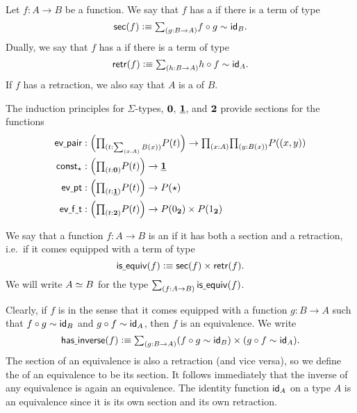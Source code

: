 \begin{defn}
Let $f:A\to B$ be a function. We say that $f$ has a  if there is a term of type
\begin{equation*}
\mathsf{sec}(f) \defeq \sm{g:B\to A} f\circ g\htpy \idfunc[B].
\end{equation*}
Dually, we say that $f$ has a  if there is a term of type
\begin{equation*}
\mathsf{retr}(f) \defeq \sm{h:B\to A} h\circ f\htpy \idfunc[A].
\end{equation*}
If $f$ has a retraction, we also say that $A$ is a  of $B$.
\end{defn}

\begin{eg}
The induction principles for $\Sigma$-types, $\emptyt$, $\unit$, and $\bool$ provide sections for the functions
\begin{align*}
\mathsf{ev\usc{}pair} & : \Big(\prd{t:\sm{x:A}B(x)}P(t)\Big)\to \prd{x:A}{y:B(x)}P((x,y)) \\
\mathsf{const}_\ttt & : \Big(\prd{t:\emptyt}P(t)\Big)\to \unit \\
\mathsf{ev\usc{}pt} & : \Big(\prd{t:\unit}P(t)\Big) \to P(\ttt) \\
\mathsf{ev\usc{}f\usc{}t} & : \Big(\prd{t:\bool}P(t)\Big) \to P(\bfalse)\times P(\btrue) \\
\end{align*}
\end{eg}

\begin{defn}
We say that a function $f:A\to B$ is an  if it has both a section and a retraction, i.e.~if it comes equipped with a term of type
\begin{equation*}
\isequiv(f)\defeq\mathsf{sec}(f)\times\mathsf{retr}(f).
\end{equation*}
We will write $\eqv{A}{B}$ for the type $\sm{f:A\to B}\isequiv(f)$.
\end{defn}

Clearly, if $f$ is  in the sense that it comes equipped with a function $g:B\to A$ such that $f\circ g\htpy\idfunc[B]$ and $g\circ f\htpy\idfunc[A]$, then $f$ is an equivalence. We write
\begin{equation*}
\mathsf{has\usc{}inverse}(f)\defeq\sm{g:B\to A} (f\circ g\htpy \idfunc[B])\times (g\circ f\htpy\idfunc[A]).
\end{equation*}
The section of an equivalence is also a retraction (and vice versa), so we define the  of an equivalence to be its section. It follows immediately that the inverse of any equivalence is again an equivalence. The identity function $\idfunc[A]$ on a type $A$ is an equivalence since it is its own section and its own retraction.

